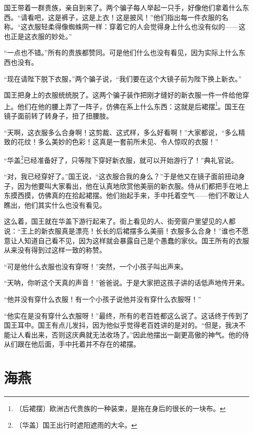 \documentclass[12pt,UTF-8,openany]{ctexbook}
\begin{document}
\begin{large}
    国王带着一群贵族，亲自到来了。两个骗子每人举起一只手，好像他们拿着什么东西。“请看吧，这是裤子，这是上衣！这是披风！”他们指出每一件衣服的名称。“这衣服轻柔得像蜘蛛网一样：穿着它的人会觉得身上什么也没有似的——这也正是这衣服的妙处。”
    
    “一点也不错。”所有的贵族都赞同。可是他们什么也没有看见，因为实际上什么东西也没有。
    
    “现在请陛下脱下衣服，”两个骗子说，“我们要在这个大镜子前为陛下换上新衣。”
    
    国王把身上的衣服统统脱了。这两个骗子装作把刚才缝好的新衣服一件一件给他穿上。他们在他的腰上弄了一阵子，仿佛在系上什么东西：这就是后裙摆\footnote{〔后裙摆〕欧洲古代贵族的一种装束，是拖在身后的很长的一块布。}。国王在镜子面前转了转身子，扭了扭腰肢。
    
    “天啊，这衣服多么合身啊！这剪裁、这式样，多么好看啊！”大家都说，“多么精致的花纹！多么美妙的色彩！这真是一套前所未见、令人惊叹的衣服！”
    
    “华盖\footnote{〔华盖〕国王出行时遮阳遮雨的大伞。}已经准备好了，只等陛下穿好新衣服，就可以开始游行了！”典礼官说。
    
    “对，我已经穿好了。”国王说，“这衣服合我的身么？”于是他又在镜子面前扭动身子，因为他要叫大家看出，他在认真地欣赏他美丽的新衣服。侍从们都把手在地上东摸西摸，仿佛真的在拾起裙摆。他们抬起手来，手中托着空气——他们不敢让人瞧出，他们其实什么也没有看见。
    
    这么着，国王就在华盖下游行起来了。街上看见的人、街旁窗户里望见的人都说：“王上的新衣服真是漂亮！长长的后裙摆多么美丽！衣服多么合身！”谁也不愿意让人知道自己看不见，因为这样就会暴露自己是个愚蠢的家伙。国王所有的衣服从来没有得到过这样一致的称赞。
    
    “可是他什么衣服也没有穿呀！”突然，一个小孩子叫出声来。
    
    “天呐，你听这个天真的声音！”爸爸说。于是大家把这孩子讲的话低声地传开来。
    
    “他并没有穿什么衣服！有一个小孩子说他并没有穿什么衣服呀！”
    
    “他实在是没有穿什么衣服呀！”最终，所有的老百姓都这么说了。这话终于传到了国王耳中。国王有点儿发抖，因为他似乎觉得老百姓讲的是对的。“但是，我决不能让人看出来，否则这庆典就无法收场了。”因此他摆出一副更高傲的神气。他的侍从们跟在他后面，手中托着并不存在的裙摆。
    
\end{large}



\chapter{海燕}
\end{document}
